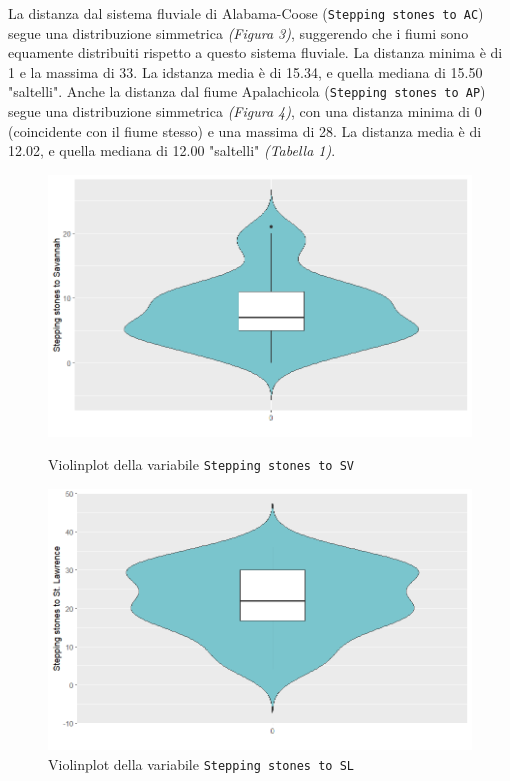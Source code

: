 \documentclass{article} %
\begin{document}
La distanza dal sistema fluviale di Alabama-Coose (\texttt{Stepping stones to AC}) segue una distribuzione simmetrica \textit{(Figura 3)}, suggerendo che i fiumi sono equamente distribuiti rispetto a questo sistema fluviale. La distanza minima è di 1 e la massima di 33. La idstanza media è di 15.34, e quella mediana di 15.50 "saltelli".
Anche la distanza dal fiume Apalachicola (\texttt{Stepping stones to AP}) segue una distribuzione simmetrica \textit{(Figura 4)}, con una distanza minima di 0 (coincidente con il fiume stesso) e una massima di 28. La distanza media è di 12.02, e quella mediana di 12.00 "saltelli" \textit{(Tabella 1)}.

\begin{figure}[H]
    \centering
    \begin{minipage}{0.49\textwidth}
        \centering
        \includegraphics[width=\textwidth]{immagini/vp_sv.png}
        \captionsetup{justification=centering}
        \caption{Violinplot della variabile \texttt{Stepping stones to SV}}
    \end{minipage}
    \hfill
    \begin{minipage}{0.49\textwidth}
        \centering
        \includegraphics[width=\textwidth]{immagini/vp_sl.png}
        \captionsetup{justification=centering}
        \caption{Violinplot della variabile \texttt{Stepping stones to SL}}
    \end{minipage}
\end{figure}
\end{document}
